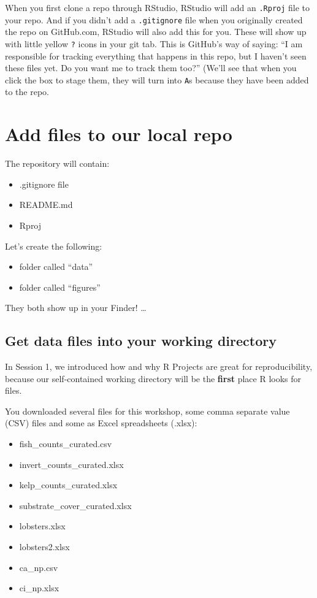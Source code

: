 \documentclass[]{book}
\providecommand{\tightlist}{%
  \setlength{\itemsep}{0pt}\setlength{\parskip}{0pt}}
\begin{document}
When you first clone a repo through RStudio, RStudio will add an \texttt{.Rproj} file to your repo. And if you didn't add a \texttt{.gitignore} file when you originally created the repo on GitHub.com, RStudio will also add this for you. These will show up with little yellow \texttt{?} icons in your git tab. This is GitHub's way of saying: ``I am responsible for tracking everything that happens in this repo, but I haven't seen these files yet. Do you want me to track them too?'' (We'll see that when you click the box to stage them, they will turn into \texttt{A}s because they have been added to the repo.

\hypertarget{add-files-to-our-local-repo}{%
\section{Add files to our local repo}\label{add-files-to-our-local-repo}}

The repository will contain:

\begin{itemize}
\tightlist
\item
  .gitignore file
\item
  README.md
\item
  Rproj
\end{itemize}

Let's create the following:

\begin{itemize}
\tightlist
\item
  folder called ``data''
\item
  folder called ``figures''
\end{itemize}

They both show up in your Finder! \ldots{}

\hypertarget{get-data-files-into-your-working-directory}{%
\subsection{Get data files into your working directory}\label{get-data-files-into-your-working-directory}}

In Session 1, we introduced how and why R Projects are great for reproducibility, because our self-contained working directory will be the \textbf{first} place R looks for files.

You downloaded several files for this workshop, some comma separate value (CSV) files and some as Excel spreadsheets (.xlsx):

\begin{itemize}
\tightlist
\item
  fish\_counts\_curated.csv
\item
  invert\_counts\_curated.xlsx
\item
  kelp\_counts\_curated.xlsx
\item
  substrate\_cover\_curated.xlsx
\item
  lobsters.xlsx
\item
  lobsters2.xlsx
\item
  ca\_np.csv
\item
  ci\_np.xlsx
\end{itemize}
\end{document}
